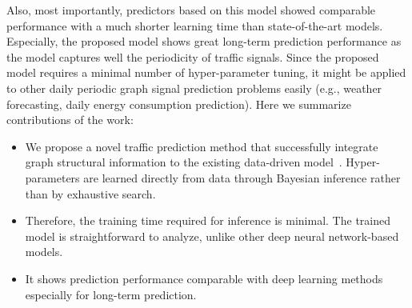 \documentclass[journal]{IEEEtran}
\begin{document}
Also, most importantly, predictors based on this model showed comparable performance with a much shorter learning time than state-of-the-art models.
Especially, the proposed model shows great long-term prediction performance as the model captures well the periodicity of traffic signals.
Since the proposed model requires a minimal number of hyper-parameter tuning, it might be applied to other daily periodic graph signal prediction problems easily (e.g., weather forecasting, daily energy consumption prediction).
Here we summarize contributions of the work:
\begin{itemize}
    \item We propose a novel traffic prediction method that successfully integrate graph structural information to the existing data-driven model~\cite{kwak2020travel}. 
    Hyper-parameters are learned directly from data through Bayesian inference rather than by exhaustive search.
    \item Therefore, the training time required for inference is minimal. The trained model is straightforward to analyze, unlike other deep neural network-based models.
    \item It shows prediction performance comparable with deep learning methods especially for long-term prediction.
\end{itemize}
\end{document}

